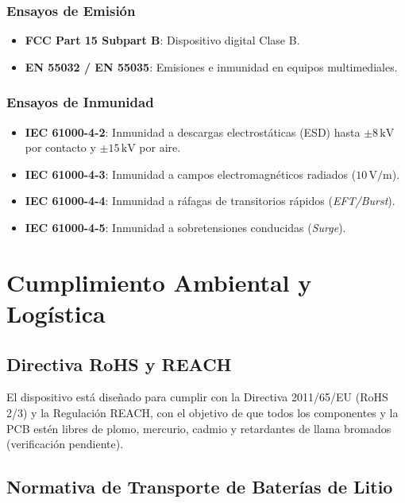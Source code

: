 \subsubsection{Ensayos de Emisión}

\begin{itemize}[leftmargin=*]
    \item \textbf{FCC Part 15 Subpart B}: Dispositivo digital Clase B.
    \item \textbf{EN 55032 / EN 55035}: Emisiones e inmunidad en equipos multimediales.
\end{itemize}

\subsubsection{Ensayos de Inmunidad}

\begin{itemize}[leftmargin=*]
    \item \textbf{IEC 61000-4-2}: Inmunidad a descargas electrostáticas (ESD) hasta $\pm 8\,\text{kV}$ por contacto y $\pm 15\,\text{kV}$ por aire.
    \item \textbf{IEC 61000-4-3}: Inmunidad a campos electromagnéticos radiados ($10\,\text{V/m}$).
    \item \textbf{IEC 61000-4-4}: Inmunidad a ráfagas de transitorios rápidos (\textit{EFT/Burst}).
    \item \textbf{IEC 61000-4-5}: Inmunidad a sobretensiones conducidas (\textit{Surge}).
\end{itemize}

\section{Cumplimiento Ambiental y Logística}

\subsection{Directiva RoHS y REACH}

El dispositivo está diseñado para cumplir con la Directiva 2011/65/EU (RoHS 2/3) y la Regulación REACH, con el objetivo de que todos los componentes y la PCB estén libres de plomo, mercurio, cadmio y retardantes de llama bromados (verificación pendiente).

\subsection{Normativa de Transporte de Baterías de Litio}

